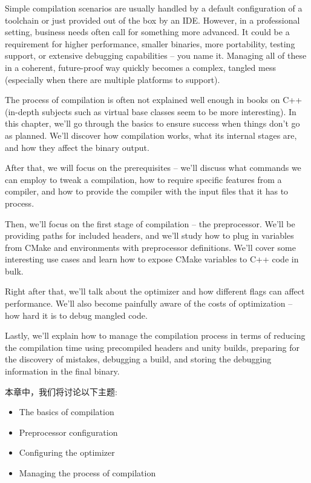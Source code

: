 Simple compilation scenarios are usually handled by a default configuration of a toolchain or just provided out of the box by an IDE. However, in a professional setting, business needs often call for something more advanced. It could be a requirement for higher performance, smaller binaries, more portability, testing support, or extensive debugging capabilities – you name it. Managing all of these in a coherent, future-proof way quickly becomes a complex, tangled mess (especially when there are multiple platforms to support).

The process of compilation is often not explained well enough in books on C++ (in-depth subjects such as virtual base classes seem to be more interesting). In this chapter, we'll go through the basics to ensure success when things don't go as planned. We'll discover how compilation works, what its internal stages are, and how they affect the binary output.

After that, we will focus on the prerequisites – we'll discuss what commands we can employ to tweak a compilation, how to require specific features from a compiler, and how to provide the compiler with the input files that it has to process.

Then, we'll focus on the first stage of compilation – the preprocessor. We'll be providing paths for included headers, and we'll study how to plug in variables from CMake and environments with preprocessor definitions. We'll cover some interesting use cases and learn how to expose CMake variables to C++ code in bulk.

Right after that, we'll talk about the optimizer and how different flags can affect performance. We'll also become painfully aware of the costs of optimization – how hard it is to debug mangled code.

Lastly, we'll explain how to manage the compilation process in terms of reducing the compilation time using precompiled headers and unity builds, preparing for the discovery of mistakes, debugging a build, and storing the debugging information in the final binary.

本章中，我们将讨论以下主题:

\begin{itemize}
\item 
The basics of compilation

\item 
Preprocessor configuration

\item 
Configuring the optimizer

\item 
Managing the process of compilation
\end{itemize}